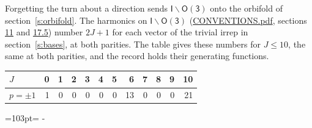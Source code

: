 \documentclass[10pt,a4paper]{article}
\newcommand{\needspace}[1]{\par\penalty-100\begingroup\dimen0=#1\relax\dimen2=\pagegoal
  \advance\dimen2-\pagetotal\ifdim\dimen0>\dimen2\relax\ifdim\dimen2>0pt\vfil\break\fi\fi
  \endgroup}
\numberwithin{equation}{section}
\newcommand{\grp}[1]{\mathsf{#1}}
\begin{document}
Forgetting the turn about a direction sends $\grp{I}\backslash\grp{O(3)}$ onto the orbifold of section~\ref{s:orbifold}.
The harmonics on $\grp{I}\backslash\grp{O(3)}$ (\href{../../CONVENTIONS.pdf}{CONVENTIONS.pdf}, sections \href{../../CONVENTIONS.pdf\#conv.11}{11} and \href{../../CONVENTIONS.pdf\#conv.17.5}{17.5}) number $2J + 1$ for each vector of the trivial irrep in section~\ref{s:bases}, at both parities. The table gives these numbers for $J \le 10$, the same at both parities, and the record holds their generating functions.
{\small\setlength{\tabcolsep}{4pt}\begin{longtable}{@{}lrrrrrrrrrrr@{}}\toprule
$J$ & 0 & 1 & 2 & 3 & 4 & 5 & 6 & 7 & 8 & 9 & 10\\\midrule\endhead
\bottomrule\endfoot\endlastfoot
$p = \pm 1$ & 1 & 0 & 0 & 0 & 0 & 0 & 13 & 0 & 0 & 0 & 21\\
\bottomrule\end{longtable}}
\needspace{103pt}
\end{document}
